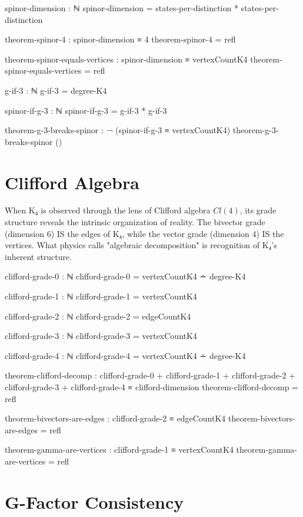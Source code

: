 \documentclass[11pt,a4paper]{book}
\begin{document}
\begin{code}
spinor-dimension : ℕ
spinor-dimension = states-per-distinction * states-per-distinction

theorem-spinor-4 : spinor-dimension ≡ 4
theorem-spinor-4 = refl

theorem-spinor-equals-vertices : spinor-dimension ≡ vertexCountK4
theorem-spinor-equals-vertices = refl

g-if-3 : ℕ
g-if-3 = degree-K4

spinor-if-g-3 : ℕ
spinor-if-g-3 = g-if-3 * g-if-3

theorem-g-3-breaks-spinor : ¬ (spinor-if-g-3 ≡ vertexCountK4)
theorem-g-3-breaks-spinor ()
\end{code}

\section{Clifford Algebra}

When K₄ is observed through the lens of Clifford algebra $Cl(4)$, its grade structure reveals the intrinsic organization of reality. The bivector grade (dimension 6) IS the edges of K₄, while the vector grade (dimension 4) IS the vertices. What physics calls "algebraic decomposition" is recognition of K₄'s inherent structure.

\begin{code}
clifford-grade-0 : ℕ
clifford-grade-0 = vertexCountK4 ∸ degree-K4

clifford-grade-1 : ℕ  
clifford-grade-1 = vertexCountK4

clifford-grade-2 : ℕ
clifford-grade-2 = edgeCountK4

clifford-grade-3 : ℕ
clifford-grade-3 = vertexCountK4

clifford-grade-4 : ℕ
clifford-grade-4 = vertexCountK4 ∸ degree-K4

theorem-clifford-decomp : clifford-grade-0 + clifford-grade-1 + clifford-grade-2 
                        + clifford-grade-3 + clifford-grade-4 ≡ clifford-dimension
theorem-clifford-decomp = refl

theorem-bivectors-are-edges : clifford-grade-2 ≡ edgeCountK4
theorem-bivectors-are-edges = refl

theorem-gamma-are-vertices : clifford-grade-1 ≡ vertexCountK4
theorem-gamma-are-vertices = refl
\end{code}

\section{G-Factor Consistency}
\end{document}
